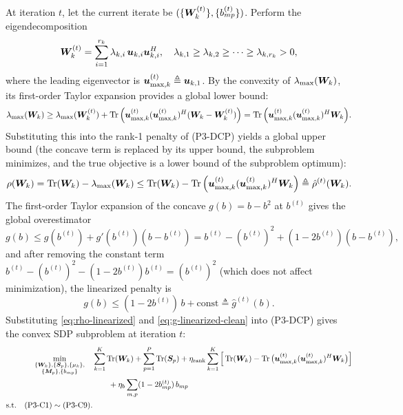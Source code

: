 At iteration $t$, let the current iterate be $(\{\bm{W}_k^{(t)}\}, \{b_{mp}^{(t)}\})$. Perform the eigendecomposition
\begin{equation}
\bm{W}_k^{(t)} = \sum_{i=1}^{r_k} \lambda_{k,i} \, \bm{u}_{k,i} \bm{u}_{k,i}^H, \quad \lambda_{k,1} \geq \lambda_{k,2} \geq \cdots \geq \lambda_{k,r_k} > 0,
\end{equation}
where the leading eigenvector is $\bm{u}_{\max,k}^{(t)} \triangleq \bm{u}_{k,1}$. By the convexity of $\lambda_{\max}(\bm{W}_k)$, its first-order Taylor expansion provides a global lower bound:
\begin{equation}\label{eq:lambda-lb}
\lambda_{\max}(\bm{W}_k) \geq \lambda_{\max}(\bm{W}_k^{(t)}) + \operatorname{Tr}\Big( \bm{u}_{\max,k}^{(t)} (\bm{u}_{\max,k}^{(t)})^H (\bm{W}_k - \bm{W}_k^{(t)}) \Big) = \operatorname{Tr}\Big( \bm{u}_{\max,k}^{(t)} (\bm{u}_{\max,k}^{(t)})^H \bm{W}_k \Big).
\end{equation}
Substituting this into the rank-1 penalty of (P3-DCP) yields a global upper bound (the concave term is replaced by its upper bound, the subproblem minimizes, and the true objective is a lower bound of the subproblem optimum):
\begin{equation}\label{eq:rho-linearized}
\rho(\bm{W}_k) = \operatorname{Tr}(\bm{W}_k) - \lambda_{\max}(\bm{W}_k) \leq \operatorname{Tr}(\bm{W}_k) - \operatorname{Tr}\Big( \bm{u}_{\max,k}^{(t)} (\bm{u}_{\max,k}^{(t)})^H \bm{W}_k \Big) \triangleq \hat{\rho}^{(t)}(\bm{W}_k).
\end{equation}
The first-order Taylor expansion of the concave $g(b) = b - b^2$ at $b^{(t)}$ gives the global overestimator
\begin{equation}\label{eq:g-linearized}
g(b) \leq g(b^{(t)}) + g'(b^{(t)})(b - b^{(t)}) = b^{(t)} - (b^{(t)})^2 + (1 - 2b^{(t)})(b - b^{(t)}),
\end{equation}
and after removing the constant term $b^{(t)} - (b^{(t)})^2 - (1 - 2b^{(t)}) b^{(t)} = (b^{(t)})^2$ (which does not affect minimization), the linearized penalty is
\begin{equation}\label{eq:g-linearized-clean}
g(b) \leq (1 - 2b^{(t)}) \, b + \text{const} \triangleq \hat{g}^{(t)}(b).
\end{equation}
Substituting \eqref{eq:rho-linearized} and \eqref{eq:g-linearized-clean} into (P3-DCP) gives the convex SDP subproblem at iteration $t$:
\begin{equation}\label{eq:p3-sca}
\begin{aligned}
\min_{\substack{\{\bm{W}_k\}, \{\bm{S}_p\}, \{\mu_k\}, \\ \{\bm{M}_p\}, \{b_{mp}\}}} \quad & \sum_{k=1}^K \operatorname{Tr}(\bm{W}_k) + \sum_{p=1}^P \operatorname{Tr}(\bm{S}_p) + \eta_{\text{rank}} \sum_{k=1}^K \Big[ \operatorname{Tr}(\bm{W}_k) - \operatorname{Tr}\big( \bm{u}_{\max,k}^{(t)} (\bm{u}_{\max,k}^{(t)})^H \bm{W}_k \big) \Big] \\
& \qquad + \eta_b \sum_{m, p} (1 - 2b_{mp}^{(t)}) \, b_{mp} \\
\text{s.t.} \quad \text{(P3-C1)}\sim\text{(P3-C9)}.
\end{aligned}
\end{equation}

